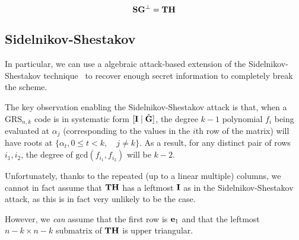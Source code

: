 \documentclass[oribibl,envcountsect,envcountsame]{llncs}
\begin{document}
\[\mathbf{S}\mathbf{G}^{\perp}=\mathbf{T}\mathbf{H}\]

 

\subsection{Sidelnikov-Shestakov}
\label{sec:sidelnikov-shestakov}


In particular, we can use a algebraic attack-based extension of the
Sidelnikov-Shestakov technique~\cite{sidelnikovshestakov} to recover enough secret information to
completely break the scheme. 

The key observation enabling the Sidelnikov-Shestakov attack is that,
when a $\text{GRS}_{n,k}$ code is in systematic form $[\mathbf{I} \mid
\hat{\mathbf{G}}]$, the degree $k-1$ polynomial $f_{i}$ being evaluated at 
$\alpha_{j}$ (corresponding to the values in the $i$th row of the matrix) will have roots at $\{\alpha_{t}, 0 \leq t < k,\quad
j\neq k\}$. As a result, for any distinct pair of rows $i_1, i_2$,
the degree of $\text{gcd}(f_{i_1}, f_{i_2})$ will be $k-2$.

Unfortunately, thanks to the repeated (up to a linear multiple) columns,  we cannot in fact
assume that $\mathbf{T}\mathbf{H}$ has a leftmost $\mathbf{I}$ as in the
Sidelnikov-Shestakov attack, as this is in fact very unlikely to be
the case. 

However, we \emph{can} assume that the first row is $\mathbf{e}_1$ and that
the leftmost $n-k \times n-k$ submatrix of $\mathbf{T}\mathbf{H}$ is upper
triangular. 


 










\end{document}
